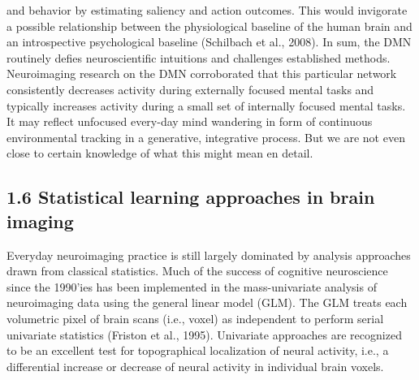\documentclass[authoryear,review,3p]{elsarticle}
\begin{document}
and behavior by estimating saliency and action outcomes.
This would invigorate a possible relationship between
the physiological baseline of the human brain
and an introspective psychological baseline
(Schilbach et al., 2008).
%
In sum, the DMN routinely defies neuroscientific intuitions
and challenges established methods.
Neuroimaging research on the DMN corroborated that this particular network
consistently decreases activity during externally focused mental tasks
and typically increases activity during a small
set of internally focused mental tasks.
It may reflect unfocused every-day mind wandering
in form of
continuous environmental tracking in a generative, integrative process.
But we are not even close to certain knowledge of
what this might mean en detail.



\subsection*{1.6 Statistical learning approaches in brain imaging}

Everyday neuroimaging practice is still largely dominated by
analysis approaches drawn from classical statistics.
%
Much of the success of cognitive neuroscience
since the 1990'ies has been implemented in the
mass-univariate analysis of neuroimaging data
using the general linear model (GLM).
The GLM treats each volumetric pixel of brain scans (i.e., voxel)
as independent to perform
serial univariate statistics (Friston et al., 1995). 
%
Univariate approaches are recognized to be an excellent
test for topographical localization of neural activity,
i.e., a differential increase or decrease
of neural activity in individual brain voxels.
\end{document}
